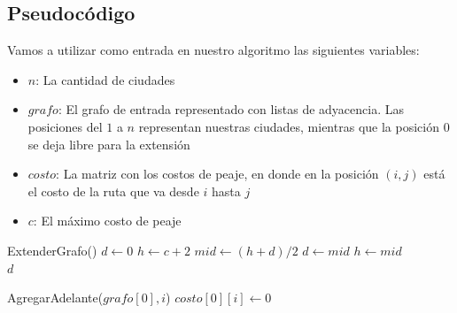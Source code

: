 \newpage
\subsection{Pseudocódigo}

Vamos a utilizar como entrada en nuestro algoritmo las siguientes variables:
\begin{itemize}
	\item $n$: La cantidad de ciudades
	\item $grafo$: El grafo de entrada representado con listas de adyacencia. Las posiciones del $1$ a $n$ representan nuestras ciudades, mientras que la posición $0$ se deja libre para la extensión
	\item $costo$: La matriz con los costos de peaje, en donde en la posición $(i,j)$ está el costo de la ruta que va desde $i$ hasta $j$
	\item $c$: El máximo costo de peaje
\end{itemize}

\begin{algorithm}[H]
\begin{algorithmic}
    
	\State ExtenderGrafo()    
    \State $d \gets 0$    
	\State $h \gets c + 2$    
	    
		\State $mid \gets (h + d)/2$    
		    
			\State $d \gets mid$    
		\Else
			\State $h \gets mid$     \\
		\EndIf
	\EndWhile
	\Return $d$    
\EndFunction
\end{algorithmic}
\end{algorithm}

\begin{algorithm}[H]
\begin{algorithmic}
    
	\For{$i \in [1..n)$}    
		\State AgregarAdelante($grafo[0], i$)    
		\State $costo[0][i] \gets 0$    
	\EndFor
\EndFunction
\end{algorithmic}
\end{algorithm}

